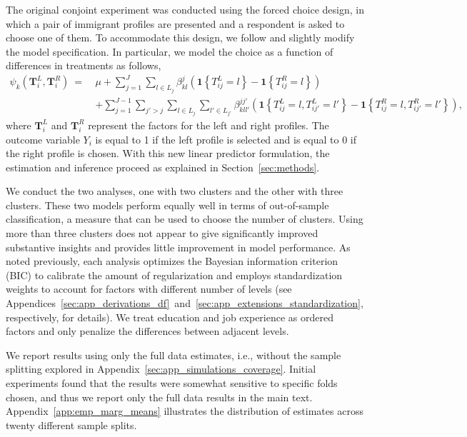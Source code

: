 \documentclass[11pt]{article}
\newcommand\bT{\bm{T}}
\begin{document}
The original conjoint experiment was conducted using the forced choice
design, in which a pair of immigrant profiles are presented and a
respondent is asked to choose one of them. To accommodate this design,
we follow \cite{egam:imai:19} and slightly modify the model
specification.  In particular, we model the choice as a function of
differences in treatments as follows,
\begin{align*}
\psi_k(\bT_i^L, \bT_i^R) \ = \ &  \mu + \sum_{j=1}^J \sum_{l \in L_j} \beta^j_{kl}\left(\mathbf{1}\left\{T^L_{ij}=l\right\}-\mathbf{1}\left\{T^R_{ij}=l\right\}\right)\\
& + \sum_{j=1}^{J-1} \sum_{j' > j} \sum_{l \in L_j} \sum_{l' \in L_{j'}} \beta^{jj'}_{kll'}\left(\mathbf{1}\left\{T^L_{ij}=l, T^L_{ij'}=l'\right\}-\mathbf{1}\left\{T^R_{ij}=l, T^R_{ij'}=l'\right\}\right),
\end{align*}
where $\bT_i^L$ and $\bT_i^R$ represent the factors for the left and
right profiles.  The outcome variable $Y_i$ is equal to 1 if the left
profile is selected and is equal to 0 if the right profile is chosen.
With this new linear predictor formulation, the estimation and
inference proceed as explained in Section~\ref{sec:methods}.

We conduct the two analyses, one with two clusters and the other with
three clusters.  These two models perform equally well in terms of
out-of-sample classification, a measure that can be used to choose the
number of clusters.  Using more than three clusters does not appear to
give significantly improved substantive insights and provides little
improvement in model performance.  As noted previously, each analysis
optimizes the Bayesian information criterion (BIC) to calibrate the
amount of regularization and employs standardization weights to
account for factors with different number of levels (see
Appendices~\ref{sec:app_derivations_df}~and~\ref{sec:app_extensions_standardization},
respectively, for details). We treat education and job experience as
ordered factors and only penalize the differences between adjacent
levels.

We report results using only the full data estimates, i.e., without
the sample splitting explored in
Appendix~\ref{sec:app_simulations_coverage}. Initial experiments found
that the results were somewhat sensitive to specific folds chosen, and
thus we report only the full data results in the main
text. Appendix~\ref{app:emp_marg_means} illustrates the distribution
of estimates across twenty different sample splits.
\end{document}
